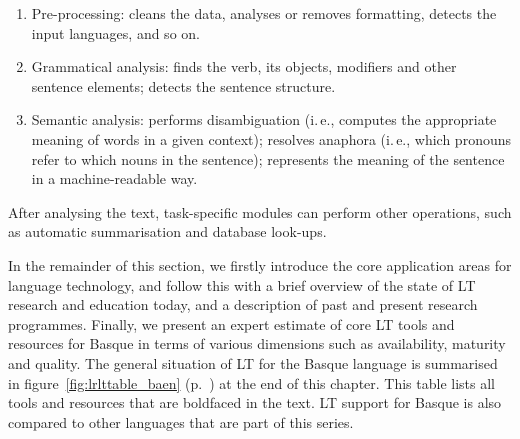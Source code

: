 \begin{multicols}{2}
\begin{enumerate}
\item Pre-processing: cleans the data, analyses or removes formatting, detects the input languages, and so on.
\item Grammatical analysis: finds the verb, its objects, modifiers and other sentence elements; detects the sentence structure.
\item Semantic analysis: performs disambiguation (i.\,e., computes the appropriate meaning of words in a given context); resolves anaphora (i.\,e., which pronouns refer to which nouns in the sentence); represents the meaning of the sentence in a machine-readable way.
\end{enumerate}

After analysing the text, task-specific modules can perform other operations, such as automatic summarisation and database look-ups.

In the remainder of this section, we firstly introduce the core application areas for language technology, and follow this with a brief overview of the state of LT research and education today, and a description of past and present research programmes. Finally, we present an expert estimate of core LT tools and resources for Basque in terms of various dimensions such as availability, maturity and quality. 
The general situation of LT for the Basque language is summarised in
figure~\ref{fig:lrlttable_baen} (p.~\pageref{fig:lrlttable_baen}) at the end of this chapter. This table lists all tools and
resources that are boldfaced in the text.
LT support for Basque is also compared to other languages that are part of this series.




\end{multicols}
